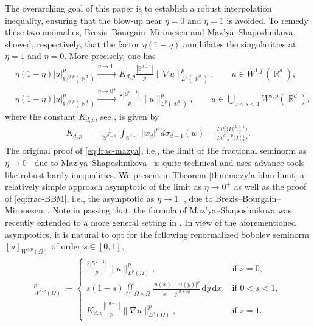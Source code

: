 \documentclass[12pt, reqno]{amsart}%
\theoremstyle{plain}  %
\theoremstyle{definition}  %
\theoremstyle{remark}
\numberwithin{equation}{section}
\DeclareMathOperator{\R}{\mathbb{R}}
\renewcommand{\d}{\,\mathrm{d}}
\begin{document}
The overarching goal of this paper is to establish a robust interpolation inequality, ensuring that the blow-up near $\eta=0$ and $\eta=1$ is avoided.  To remedy these two anomalies, Brezis--Bourgain--Mironescu \cite{BBM01} and Maz'ya--Shaposhnikova \cite{MS02} showed, respectively, that the factor $\eta(1-\eta)$ annihilates  the singularities at $\eta=1$ and $\eta=0$.  More precisely, one has
\begin{align} \label{eq:frac-BBM}
& \eta(1-\eta)|u|^p_{W^{\eta, p}(\R^d)}
\xrightarrow{\eta\to 1^-} K_{d,p}  \frac{|\mathbb{S}^{d-1}|}{p}\|\nabla u\|^p_{L^p(\R^d)}, \qquad u\in W^{1,p}(\R^d),\\[2ex]
\label{eq:frac-mazya}
&\eta(1-\eta)|u|^p_{W^{\eta, p}(\R^d)} \xrightarrow{\eta\to 0^+}\frac{2|\mathbb{S}^{d-1}|}{p}\| u\|^p_{L^p(\R^d)}, \qquad u\in \bigcup_{0 < s < 1} W^{s,p}(\R^d),
\end{align}
where the constant $K_{d,p}$,  see \cite{Fog23}, is given by
\begin{align*}
K_{d,p}
&= \frac{1}{|\mathbb{S}^{d-1}|}\int_{\mathbb{S}^{d-1}} |w_d|^p \, d\sigma_{d-1}(w)
= \frac{\Gamma\big(\frac{d}{2}\big) \Gamma\big(\frac{p+1}{2}\big)}{\Gamma\big(\frac{d+p}{2}\big) \Gamma\big(\frac{1}{2}\big)}.
\end{align*}
The original proof of \eqref{eq:frac-mazya}, i.e., the  limit of the fractional seminorm as $\eta\to0^+$  due to Maz'ya--Shaposhnikova~\cite{MS02} is quite technical and uses advance tools like robust hardy inequalities. We  present  in Theorem \ref{thm:mazy'a-bbm-limit} a relatively simple approach asymptotic of the limit as $\eta\to 0^+$
as well as the proof of \eqref{eq:frac-BBM}, i.e., the   asymptotic as $ \eta \to 1^- $, due to Brezis--Bourgain--Mironescu~\cite{BBM01}.
Note in passing that, the formula of Maz'ya--Shaposhnikova was recently extended to a more general setting in \cite{DDGA25}.
In view of the aforementioned asymptotics, it is natural to opt for the following renormalized Sobolev seminorm
$[u]_{W^{s,p}(\Omega)}$ of order $s \in [0,1]$,
\begin{align*}
[u]^p_{W^{s,p}(\Omega)} :=
\begin{cases}
\displaystyle \frac{2|\mathbb{S}^{d-1}|}{p} \|u\|^p_{L^p(\Omega)}, & \text{if } s = 0, \\
\displaystyle s(1 - s) \iint_{\Omega\times\Omega}
\frac{|u(x) - u(y)|^p}{|x - y|^{d + sp}}\d y\d x, & \text{if } 0 < s < 1, \\
\displaystyle K_{d,p} \frac{|\mathbb{S}^{d-1}|}{p} \|\nabla u\|^p_{L^p(\Omega)}, & \text{if } s = 1.
\end{cases}
\end{align*}
\end{document}
